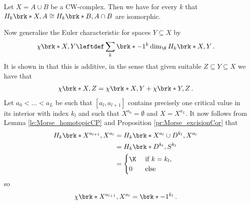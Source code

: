 \begin{proposition}
  \label{pr:Morse_excisionCor}
  Let $X=A\cup B$ be a CW-complex. Then we have for every $k$ that $H_k\brk*{X,A}\cong H_k\brk*{B,A\cap B}$
  are isomorphic.
\end{proposition}
Now generalise the Euler characteristic for spaces $Y\subseteq X$ by
\begin{align}
  \chi\brk*{X,Y}\leftdef \sum_k\brk*{-1}^k\dim_\K H_k\brk*{X,Y}\,.
  \label{eq:Morse_relativeEuler}
\end{align}
It is shown in \cite[§5]{Milnor1963} that this is additive, in the sense that given suitable $Z\subseteq Y\subseteq X$
we have that
\begin{align}
  \chi\brk*{X,Z}=\chi\brk*{X,Y}+\chi\brk*{Y,Z}\label{eq:MorseIneq_additivChi}\,.
\end{align}
Let $a_0<\dots<a_L$ be such that $[a_l,a_{l+1}]$ contains precisely one critical value in its interior with
index $k_l$ and such that $X^{a_0}=\emptyset$ and  $X=X^{a_L}$.
It now follows from Lemma \ref{le:Morse_homotopicCP} and Proposition \ref{pr:Morse_excisionCor} that
\begin{align*}
  H_k\brk*{X^{a_{l+1}},X^{a_{l}}}
  &=H_k\brk*{X^{a_{l}}\cup D^{k_l},X^{a_{l}}} \\
  &= H_k\brk*{D^{k_l},S^{k_l}} \\
  &=\begin{cases}
    \K &\text{ if }k=k_l,\\
    0 &\text{ else}
  \end{cases}
\end{align*}
so
\begin{align}
  \chi\brk*{X^{a_{l+1}},X^{a_l}}=\brk*{-1}^{k_l}\,.\label{eq:Morse_chiSingleCP}
\end{align}
